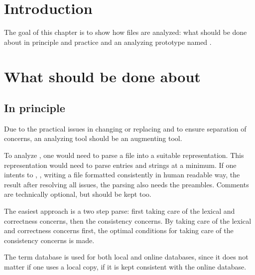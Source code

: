 \section{Introduction}

The goal of this chapter is to show how {\bibtex} files are analyzed:
what should be done about {\bibtex} in principle and practice
 and an analyzing prototype named
{\orangutan} .


\section{What should be done about {\bibtex}}
\label{sec:analyzing_what_to_do}
\subsection{In principle}

Due to the practical issues in changing or replacing {\bibtex} and to
ensure separation of concerns, an analyzing tool should be an
augmenting tool.

To analyze {\bibtex}, one would need to parse a {\bibtex} file into a
suitable representation.  This representation would need to parse
{\bibtex} entries and strings at a minimum.  If one intents to
, \ie, writing a {\bibtex} file formatted
consistently in human readable way, the result after resolving all
issues, the parsing also needs the preambles.  Comments are
technically optional, but should be kept too.

The easiest approach is a two step parse: first taking care of the
lexical and correctness concerns, then the consistency concerns.  By
taking care of the lexical and correctness concerns first, the optimal
conditions for taking care of the consistency concerns is made.

The term database is used for both local and online databases, since
it does not matter if one uses a local copy, if it is kept consistent
with the online database.


